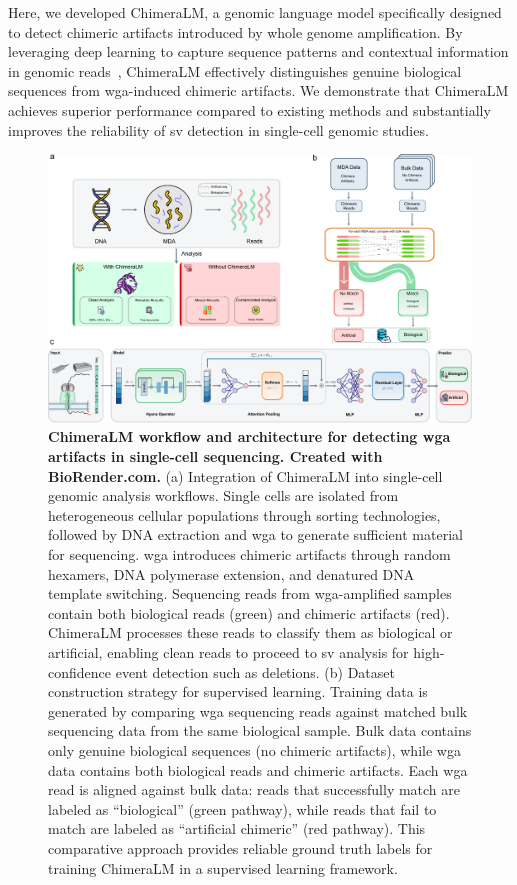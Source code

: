 \documentclass[pdflatex,sn-nature]{sn-jnl}%
\theoremstyle{thmstyleone}%
\theoremstyle{thmstyletwo}%
\theoremstyle{thmstylethree}%
\begin{document}
Here, we developed ChimeraLM, a genomic language model specifically designed to detect chimeric artifacts introduced by whole genome amplification.
By leveraging deep learning to capture sequence patterns and contextual information in genomic reads~\cite{dalla2025nucleotide, zhou2023dnabert, nguyen2023hyenadna}, ChimeraLM effectively distinguishes genuine biological sequences from \gls{wga}-induced chimeric artifacts.
We demonstrate that ChimeraLM achieves superior performance compared to existing methods and substantially improves the reliability of \gls{sv} detection in single-cell genomic studies.

\begin{figure}[!ht]
	\begin{center}
		\includegraphics[width=\textwidth]{final_figures/figure1}
	\end{center}
	\caption{{\bf ChimeraLM workflow and architecture for detecting \gls{wga} artifacts in single-cell sequencing. Created with BioRender.com.}
		(a) Integration of ChimeraLM into single-cell genomic analysis workflows. Single cells are isolated from heterogeneous cellular populations through sorting technologies, followed by DNA extraction and \gls{wga} to generate sufficient material for sequencing. \gls{wga} introduces chimeric artifacts through random hexamers, DNA polymerase extension, and denatured DNA template switching. Sequencing reads from \gls{wga}-amplified samples contain both biological reads (green) and chimeric artifacts (red). ChimeraLM processes these reads to classify them as biological or artificial, enabling clean reads to proceed to \gls{sv} analysis for high-confidence event detection such as deletions.
		(b) Dataset construction strategy for supervised learning. Training data is generated by comparing \gls{wga} sequencing reads against matched bulk sequencing data from the same biological sample. Bulk data contains only genuine biological sequences (no chimeric artifacts), while \gls{wga} data contains both biological reads and chimeric artifacts. Each \gls{wga} read is aligned against bulk data: reads that successfully match are labeled as ``biological'' (green pathway), while reads that fail to match are labeled as ``artificial chimeric'' (red pathway). This comparative approach provides reliable ground truth labels for training ChimeraLM in a supervised learning framework.
}
\end{figure}
\end{document}
